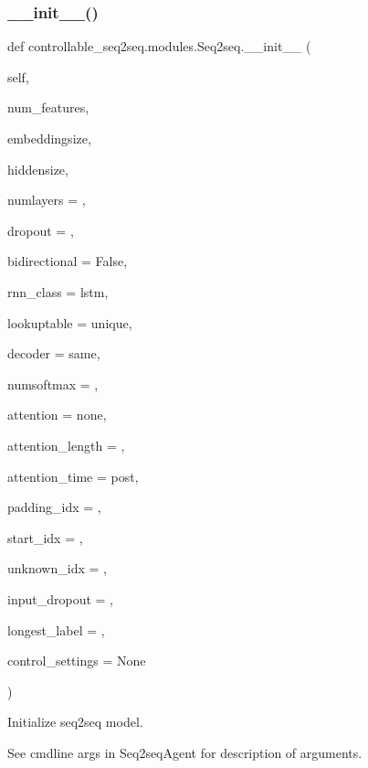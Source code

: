 \subsubsection{\texorpdfstring{\+\_\+\+\_\+init\+\_\+\+\_\+()}{\_\_init\_\_()}}
{\footnotesize\ttfamily def controllable\+\_\+seq2seq.\+modules.\+Seq2seq.\+\_\+\+\_\+init\+\_\+\+\_\+ (\begin{DoxyParamCaption}\item[{}]{self,  }\item[{}]{num\+\_\+features,  }\item[{}]{embeddingsize,  }\item[{}]{hiddensize,  }\item[{}]{numlayers = {},  }\item[{}]{dropout = {},  }\item[{}]{bidirectional = {\ttfamily False},  }\item[{}]{rnn\+\_\+class = {\ttfamily \textquotesingle{}lstm\textquotesingle{}},  }\item[{}]{lookuptable = {\ttfamily \textquotesingle{}unique\textquotesingle{}},  }\item[{}]{decoder = {\ttfamily \textquotesingle{}same\textquotesingle{}},  }\item[{}]{numsoftmax = {},  }\item[{}]{attention = {\ttfamily \textquotesingle{}none\textquotesingle{}},  }\item[{}]{attention\+\_\+length = {},  }\item[{}]{attention\+\_\+time = {\ttfamily \textquotesingle{}post\textquotesingle{}},  }\item[{}]{padding\+\_\+idx = {},  }\item[{}]{start\+\_\+idx = {},  }\item[{}]{unknown\+\_\+idx = {},  }\item[{}]{input\+\_\+dropout = {},  }\item[{}]{longest\+\_\+label = {},  }\item[{}]{control\+\_\+settings = {\ttfamily None} }\end{DoxyParamCaption})}

\begin{DoxyVerb}Initialize seq2seq model.

See cmdline args in Seq2seqAgent for description of arguments.
\end{DoxyVerb}
 

